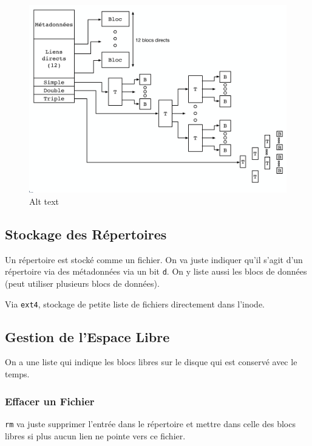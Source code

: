 \begin{figure}
\centering
\includegraphics{image-45.png}
\caption{Alt text}
\end{figure}

\subsection{Stockage des Répertoires}\label{stockage-des-ruxe9pertoires}

Un répertoire est stocké comme un fichier. On va juste indiquer qu'il
s'agit d'un répertoire via des métadonnées via un bit \texttt{d}. On y
liste aussi les blocs de données (peut utiliser plusieurs blocs de
données).

Via \texttt{ext4}, stockage de petite liste de fichiers directement dans
l'inode.

\subsection{Gestion de l'Espace Libre}\label{gestion-de-lespace-libre}

On a une liste qui indique les blocs libres sur le disque qui est
conservé avec le temps.

\subsubsection{Effacer un Fichier}\label{effacer-un-fichier}

\texttt{rm} va juste supprimer l'entrée dans le répertoire et mettre
dans celle des blocs libres si plus aucun lien ne pointe vers ce
fichier.

